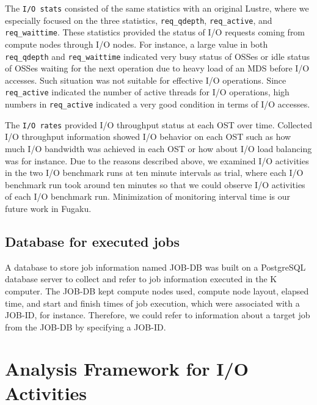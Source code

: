 \documentclass{jhps}
\begin{document}
The {\tt I/O stats} consisted of the same statistics with an original Lustre,
where we especially focused on the three statistics,
{\tt req\_qdepth}, {\tt req\_active}, and {\tt req\_waittime}.
These statistics provided the status of I/O requests coming from compute nodes through I/O nodes.
For instance, a large value in both {\tt req\_qdepth} and {\tt req\_waittime} indicated
very busy status of OSSes or idle status of OSSes waiting for the next operation
due to heavy load of an MDS before I/O accesses.
Such situation was not suitable for effective I/O operations.
Since {\tt req\_active} indicated the number of active threads for I/O operations,
high numbers in {\tt req\_active} indicated a very good condition
in terms of I/O accesses.

The {\tt I/O rates} provided I/O throughput status at each OST over time.
Collected I/O throughput information showed I/O behavior on each OST
such as how much I/O bandwidth was achieved in each OST or
how about I/O load balancing was for instance.
Due to the reasons described above, we examined I/O activities
in the two I/O benchmark runs at ten minute intervals as trial,
where each I/O benchmark run took around ten minutes
so that we could observe I/O activities of each I/O benchmark run.
Minimization of monitoring interval time is our future work in Fugaku.

\subsection{Database for executed jobs}
\label{ssec:JOB_DB}

A database to store job information named JOB-DB
was built on a PostgreSQL database server to collect
and refer to job information executed in the K computer.
The JOB-DB kept compute nodes used, compute node layout, elapsed time,
and start and finish times of job execution,
which were associated with a JOB-ID, for instance.
Therefore, we could refer to information about a target job
from the JOB-DB by specifying a JOB-ID.

\section{Analysis Framework for I/O Activities}
\label{sec:ANAL_SYS}
\end{document}
